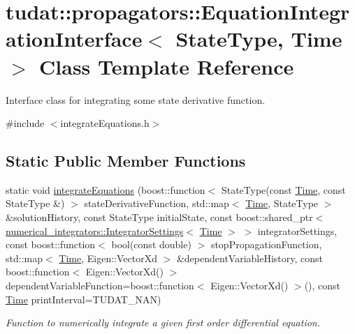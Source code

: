 \hypertarget{classtudat_1_1propagators_1_1EquationIntegrationInterface_3_01StateType_00_01Time_01_4}{}\section{tudat\+:\+:propagators\+:\+:Equation\+Integration\+Interface$<$ State\+Type, Time $>$ Class Template Reference}
\label{classtudat_1_1propagators_1_1EquationIntegrationInterface_3_01StateType_00_01Time_01_4}


Interface class for integrating some state derivative function.  




{\ttfamily \#include $<$integrate\+Equations.\+h$>$}

\subsection*{Static Public Member Functions}
\begin{DoxyCompactItemize}
\item 
static void \hyperlink{classtudat_1_1propagators_1_1EquationIntegrationInterface_3_01StateType_00_01Time_01_4_a76eb9dd2db530024ec0d989535cc3dc1}{integrate\+Equations} (boost\+::function$<$ State\+Type(const \hyperlink{classtudat_1_1Time}{Time}, const State\+Type \&) $>$ state\+Derivative\+Function, std\+::map$<$ \hyperlink{classtudat_1_1Time}{Time}, State\+Type $>$ \&solution\+History, const State\+Type initial\+State, const boost\+::shared\+\_\+ptr$<$ \hyperlink{classtudat_1_1numerical__integrators_1_1IntegratorSettings}{numerical\+\_\+integrators\+::\+Integrator\+Settings}$<$ \hyperlink{classtudat_1_1Time}{Time} $>$ $>$ integrator\+Settings, const boost\+::function$<$ bool(const double) $>$ stop\+Propagation\+Function, std\+::map$<$ \hyperlink{classtudat_1_1Time}{Time}, Eigen\+::\+Vector\+Xd $>$ \&dependent\+Variable\+History, const boost\+::function$<$ Eigen\+::\+Vector\+Xd() $>$ dependent\+Variable\+Function=boost\+::function$<$ Eigen\+::\+Vector\+Xd() $>$(), const \hyperlink{classtudat_1_1Time}{Time} print\+Interval=T\+U\+D\+A\+T\+\_\+\+N\+AN)
\begin{DoxyCompactList}\small\item\em Function to numerically integrate a given first order differential equation. \end{DoxyCompactList}\end{DoxyCompactItemize}


